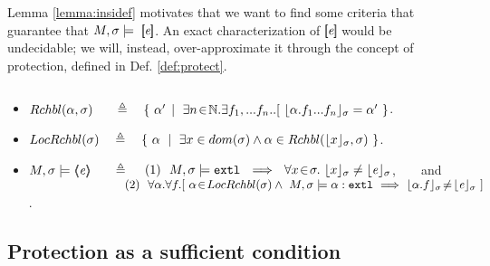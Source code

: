 \documentclass[acmsmall,review,anonymous,screen]{acmart}\settopmatter{printfolios=true,printacmref=false}
\begin{document}
{ \vspace{.3cm}
 Lemma \ref{lemma:insidef} motivates that we want to find some criteria that guarantee that $M, \sigma \models \  [\!\![ \mathit{e} ]\!\!]$.
 An exact characterization of $ [\!\![ \mathit{e} ]\!\!]$ would be undecidable; we will, instead, over-approximate it through the concept of protection, defined in Def. \ref{def:protect}.
 
  
 
 
 
 
 
\begin{definition}
$~ \ $
\label{def:protect}

\begin{itemize}

\item
{{$\Relevant {\alpha} {\sigma}  \ \ \ \ \ \triangleq \ \  \  \{ \ \alpha' \, \mid \ \exists n\!\in\!\mathbb{N}.\exists f_1,...f_n.. [\ \interpret {\sigma} {\alpha.f_1...f_n} = \alpha'\ \}$}}.

\item
$ \LRelevantO   \sigma  \ \  \ \triangleq \ \  \  \{ \ \alpha \ \mid \ { \exists x\in dom(\sigma) \wedge \alpha \in \Relevant {\interpret  {\sigma} x}
{\sigma} \ \} } $.

\item
\label{sect:semantics:assert:prt}
$\satisfiesA{M}{\sigma} {\inside {\re}}  \ \ \ \  \ \triangleq \ \ \   $
 $(1)\ \ \satisfiesA{M}{\sigma}{\extThis}\ \ \Longrightarrow\ \ \forall x\!\in\! \sigma.\ \interpret \sigma x  \neq \interpret \sigma \re $,\ \ \ \ and 
\\
$~\strut  \hspace{2.7cm} (2) \ \ \forall \alpha.\forall f.[\ \alpha\!\in\!{LocRchbl(\sigma)} \wedge\   M , \sigma \models \alpha:\mbox{\normalfont{\texttt{extl}}} 
  \ \Longrightarrow \  
  \lfloor \alpha.f \rfloor_{\sigma}\! \neq \! \lfloor \mathit{e} \rfloor_{\sigma}     \ ] $.

\end{itemize}

\end{definition}

\subsection{Protection as a sufficient condition}

}
\end{document}
